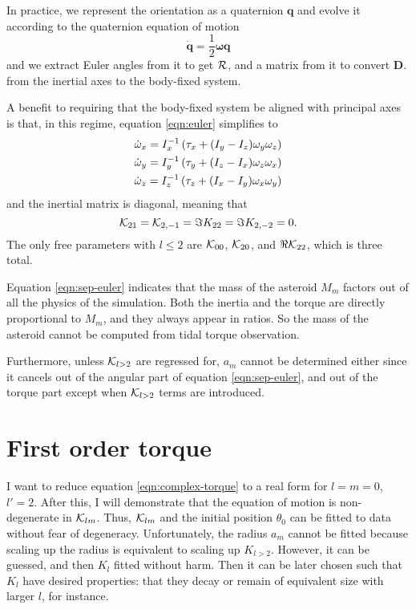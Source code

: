 \documentclass[aps,twocolumn,secnumarabic,balancelastpage,amsmath,amssymb,nofootinbib,floatfix]{revtex4-1}
\begin{document}
In practice, we represent the orientation as a quaternion $\bm q$ and evolve it according to the quaternion equation of motion
$$\dot {\bm q} = \frac{1}{2}\bm \omega \bm q$$
and we extract Euler angles from it to get $\mathcal{R}$, and a matrix from it to convert $\bm D$. from the inertial axes to the body-fixed system.

A benefit to requiring that the body-fixed system be aligned with principal axes is that, in this regime, equation \ref{eqn:euler} simplifies to
\begin{equation}
\begin{aligned}
\dot \omega_x = I_x^{-1}\left( \tau_x + (I_y - I_z)\omega_y \omega_z \right)\\
\dot \omega_y = I_y^{-1}\left( \tau_y + (I_z - I_x)\omega_z \omega_x \right)\\
\dot \omega_z = I_z^{-1}\left( \tau_z + (I_x - I_y)\omega_x \omega_y \right)\\
\label{eqn:sep-euler}
\end{aligned}
\end{equation}
and the inertial matrix is diagonal, meaning that
$$\mathcal{K}_{21} = \mathcal{K}_{2,-1}=\Im K_{22} = \Im K_{2,-2}= 0.$$
The only free parameters with $l\leq 2$ are $\mathcal{K}_{00}$, $\mathcal{K}_{20}$, and $\Re \mathcal{K}_{22}$, which is three total.

Equation \ref{eqn:sep-euler} indicates that the mass of the asteroid $M_m$ factors out of all the physics of the simulation. Both the inertia and the torque are directly proportional to $M_m$, and they always appear in ratios. So the mass of the asteroid cannot be computed from tidal torque observation.

Furthermore, unless $\mathcal{K}_{l>2}$ are regressed for, $a_m$ cannot be determined either since it cancels out of the angular part of equation \ref{eqn:sep-euler}, and out of the torque part except when $\mathcal{K}_{l>2}$ terms are introduced.



\section{First order torque}
I want to reduce equation \ref{eqn:complex-torque} to a real form for $l=m=0$, $l'=2$. After this, I will demonstrate that the equation of motion is non-degenerate in $\mathcal{K}_{lm}$. Thus, $\mathcal{K}_{lm}$ and the initial position $\theta_0$ can be fitted to data without fear of degeneracy. Unfortunately, the radius $a_m$ cannot be fitted because scaling up the radius is equivalent to scaling up $K_{l>2}$. However, it can be guessed, and then $K_{l}$ fitted without harm. Then it can be later chosen such that $K_l$ have desired properties: that they decay or remain of equivalent size with larger $l$, for instance.
\end{document}
